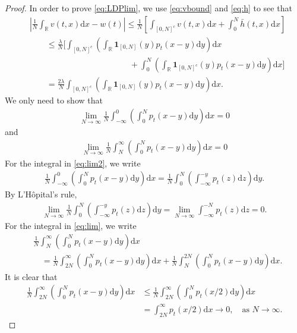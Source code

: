 \documentclass[12pt, reqno]{amsart}
\newcommand{\R}{{\mathbb{R}}}
\renewcommand{\d}{\mathrm{d}}
\newcommand{\<}{\langle}
\renewcommand{\>}{\rangle}
\begin{document}
\begin{proof}
In order to prove \eqref{eq:LDPlim},
we use \eqref{eq:vbound} and \eqref{eq:h} to see that
\begin{align*}
&\left|\frac1N\int_\R v(t,x)\d x -w(t)\right| 
\leq \frac1N\left[\int_{[0, N]^c} v(t,x)\d x  + \int_0^N \bar{h}(t,x)\d x\right]\\
&\qquad\leq  \frac\lambda N\Big[\int_{[0, N]^c}\left(  \int_\R \bm{1}_{[0, N]}(y) p_t(x-y)\d y\right)\d x  \\
&\qquad\qquad\qquad\qquad \qquad\qquad
+ \int_0^N \left( \int_\R \bm{1}_{[0, N]^c}(y)p_t(x-y)\d y\right)\d x\Big]\\
&\qquad =\frac{2\lambda} N\int_{[0, N]^c}\left(  \int_\R \bm{1}_{[0, N]}(y) p_t(x-y)\d y\right)\d x.
\end{align*}
We only need to show that
\begin{align}\label{eq:lim2}
\lim_{N\to\infty} \frac1N\int_{-\infty}^0 \left(\int_0^N p_t(x-y)\d y\right) \d x =0
\end{align}
and
\begin{align}\label{eq:lim}
  \lim_{N\to\infty} \frac1N\int^{\infty}_N \left(\int_0^N p_t(x-y)\d y\right) \d x =0
\end{align}
For the integral in \eqref{eq:lim2}, we write
\begin{align*}
 \frac1N\int_{-\infty}^0 \left(\int_0^N p_t(x-y)\d y\right) \d x= \frac1N \int_0^N \left(\int_{-\infty}^{-y}p_t(z)\d z\right)\d y.
\end{align*}
By L'H\^opital's rule, 
\begin{align*}
\lim_{N\to\infty} \frac1N \int_0^N \left(\int_{-\infty}^{-y}p_t(z)\d z\right)\d y = \lim_{N\to\infty} \int_{-\infty}^{-N}p_t(z)\d z =0.
\end{align*}
For the  integral in \eqref{eq:lim}, we write
\begin{align*}
&\frac1N\int^{\infty}_N \left(\int_0^N p_t(x-y)\d y\right) \d x\\
& \quad= \frac1N\int^{\infty}_{2N} \left(\int_0^N p_t(x-y)\d y\right) \d x
+ \frac1N\int^{2N}_N \left(\int_0^N p_t(x-y)\d y\right) \d x.
\end{align*}
It is clear that
\begin{equation*} %
\begin{split}
 \frac1N\int^{\infty}_{2N} \left(\int_0^N p_t(x-y)\d y\right) \d x &\leq \frac1N \int^{\infty}_{2N} \left(\int_0^N p_t(x/2)\d y\right) \d x\\
 &=\int_{2N}^{\infty}p_t(x/2)\d x \to 0, \quad \text{as $N\to\infty$.}
\end{split}

\end{equation*}
\end{proof}
\end{document}
